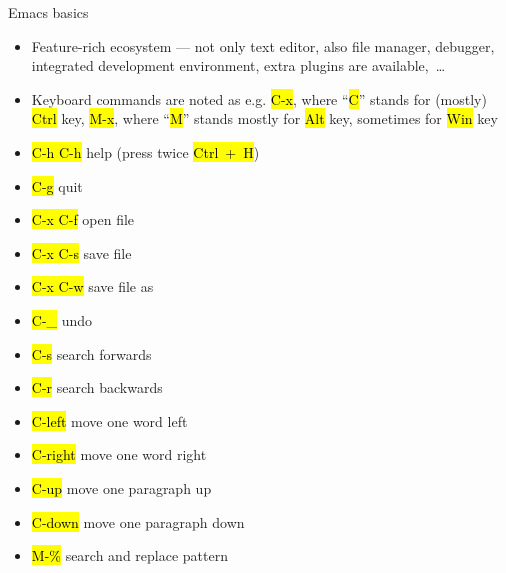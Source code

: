 \documentclass[compress, ucs, xelatex, 11pt, xcolor=svgnames,
  hyperref={
    bookmarks=true,
    unicode=true,
    colorlinks=true,
    pdftitle={Linux, command line and MetaCentrum},
    plainpages=false,
    pdfauthor={Vojtech Zeisek},
    pdfsubject={Course about use of Linux command line, writing shell scripts and using MetaCentrum of CESNET},
    pdfcreator={XeLaTeX},
    pdfkeywords={Linux, GNU, BASH, shell, command line, MetaCentrum},
    linkcolor=DarkRed,
    anchorcolor=DarkBlue,
    citecolor=Indigo,
    filecolor=NavyBlue,
    menucolor=DarkMagenta,
    urlcolor=DarkBlue,
    pdftex},
  url={hyphens, lowtilde} %
  ]{beamer}
\renewcommand{\texttt}[1]{\hl{\ttfamily #1}}
\begin{document}
\begin{frame}{Emacs basics}
  \begin{itemize}
    \item Feature-rich ecosystem --- not only text editor, also file manager, debugger, integrated development environment, extra plugins are available,~\ldots
    \item Keyboard commands are noted as e.g. \texttt{C-x}, where ``\texttt{C}'' stands for (mostly) \texttt{Ctrl} key, \texttt{M-x}, where ``\texttt{M}'' stands mostly for \texttt{Alt} key, sometimes for \texttt{Win} key
  \end{itemize}
  \begin{multicols}{2}
    \begin{itemize}
      \item \texttt{C-h C-h} help (press twice \texttt{Ctrl~+~H})
      \item \texttt{C-g} quit
      \item \texttt{C-x C-f} open file
      \item \texttt{C-x C-s} save file
      \item \texttt{C-x C-w} save file as
      \item \texttt{C-\_} undo
      \item \texttt{C-s} search forwards
      \item \texttt{C-r} search backwards
      \item \texttt{C-left} move one word left
      \item \texttt{C-right} move one word right
      \item \texttt{C-up} move one paragraph up
      \item \texttt{C-down} move one paragraph down
      \item \texttt{M-\%} search and replace pattern
    \end{itemize}
  \end{multicols}
\end{frame}
\end{document}
